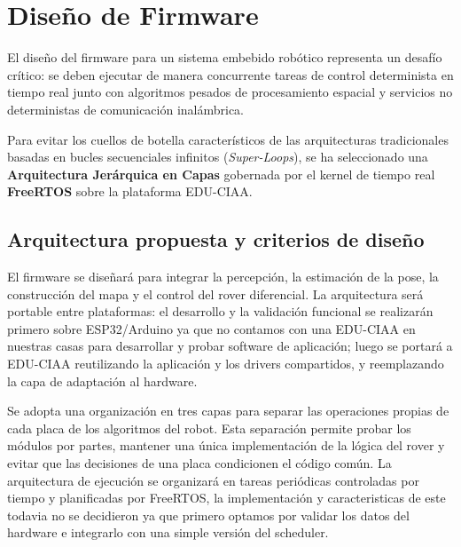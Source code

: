 \newcommand{\ruta}[1]{\texttt{#1}}
\section{Diseño de Firmware}

El diseño del firmware para un sistema embebido robótico representa un desafío crítico: se deben ejecutar de manera concurrente tareas de control determinista en tiempo real junto con algoritmos pesados de procesamiento espacial y servicios no deterministas de comunicación inalámbrica.

Para evitar los cuellos de botella característicos de las arquitecturas tradicionales basadas en bucles secuenciales infinitos (\textit{Super-Loops}), se ha seleccionado una \textbf{Arquitectura Jerárquica en Capas} gobernada por el kernel de tiempo real \textbf{FreeRTOS} sobre la plataforma EDU-CIAA.

\subsection{Arquitectura propuesta y criterios de diseño}

El firmware se diseñará para integrar la percepción, la estimación de la pose,
la construcción del mapa y el control del rover diferencial. La arquitectura
será portable entre plataformas: el desarrollo y la validación funcional se
realizarán primero sobre ESP32/Arduino ya que no contamos con una EDU-CIAA en nuestras casas para desarrollar y probar software de aplicación; luego se portará a EDU-CIAA reutilizando la
aplicación y los drivers compartidos, y reemplazando la capa de adaptación al
hardware.

Se adopta una organización en tres capas para separar las operaciones propias
de cada placa de los algoritmos del robot. Esta separación permite probar los
módulos por partes, mantener una única implementación de la lógica del rover y
evitar que las decisiones de una placa condicionen el código común. La
arquitectura de ejecución se organizará en tareas periódicas controladas por
tiempo y planificadas por FreeRTOS, la implementación y caracteristicas de este todavia no se decidieron ya que primero optamos por validar los datos del hardware e integrarlo con una simple versión del scheduler.

